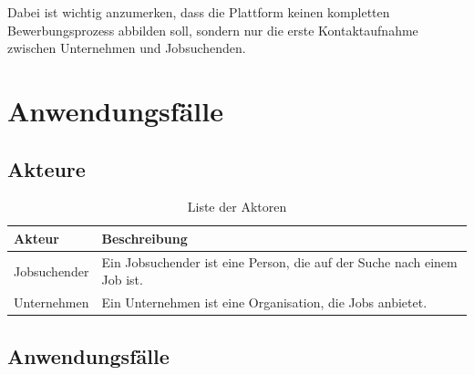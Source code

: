 \documentclass[12pt, letterpaper]{article}
\begin{document}
    Dabei ist wichtig anzumerken, dass die Plattform keinen kompletten Bewerbungsprozess
    abbilden soll, sondern nur die erste Kontaktaufnahme zwischen Unternehmen und Jobsuchenden.

    \newpage
    \section{Anwendungsfälle}
    

    \subsection{Akteure}

    \begin{table}[htbp]
        \label{tab:aktoren}
        \begin{tabular}{|p{}|p{}|}
            \hline
            \textbf{Akteur} & \textbf{Beschreibung} \\
            \hline
            \hline
            Jobsuchender & Ein Jobsuchender ist eine Person, die auf der Suche nach einem Job ist. \\
            \hline
            Unternehmen & Ein Unternehmen ist eine Organisation, die Jobs anbietet. \\
            \hline
        \end{tabular}
        \caption{Liste der Aktoren}
    \end{table}

    \subsection{Anwendungsfälle}
\end{document}
